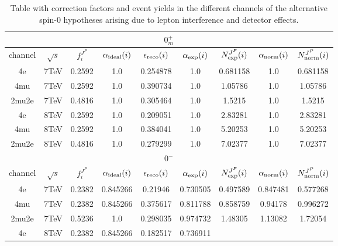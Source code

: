 \begin{table}[b]
\centering
\caption{
Table with correction factors and event yields in the different
channels of the alternative spin-0 hypotheses arising
due to lepton interference and detector effects.}
\centering %
\begin{tabular}{c c c c c c c c c} %
\hline \hline
 \multicolumn{9}{|c|}{$0^{+}_{m}$} \\ \hline 
channel & $\sqrt{s}$ & $f_{i}^{J^P}$ & $\alpha_{\rm ideal} (i)$ & $\epsilon_{\rm reco} (i)$ & $\alpha_{\rm exp} (i)$ & $N^{J^P}_{\rm exp} (i)$ & $\alpha_{\rm norm} (i)$ & $N^{J^P}_{\rm norm} (i)$\\ \hline 
4e & 7TeV & 0.2592 &  1.0  & 0.254878 &  1.0  & 0.681158 &  1.0  & 0.681158 \\ \hline 4mu & 7TeV & 0.2592 &  1.0  & 0.390734 &  1.0  & 1.05786 &  1.0  & 1.05786 \\ \hline 2mu2e & 7TeV & 0.4816 &  1.0  & 0.305464 &  1.0  & 1.5215 &  1.0  & 1.5215 \\ \hline \hline 4e & 8TeV & 0.2592 &  1.0  & 0.209051 &  1.0  & 2.83281 &  1.0  & 2.83281 \\ \hline 4mu & 8TeV & 0.2592 &  1.0  & 0.384041 &  1.0  & 5.20253 &  1.0  & 5.20253 \\ \hline 2mu2e & 8TeV & 0.4816 &  1.0  & 0.279299 &  1.0  & 7.02377 &  1.0  & 7.02377 \\ \hline \hline  \multicolumn{9}{|c|}{$0^{-}$} \\ \hline 
channel & $\sqrt{s}$ & $f_{i}^{J^P}$ & $\alpha_{\rm ideal} (i)$ & $\epsilon_{\rm reco} (i)$ & $\alpha_{\rm exp} (i)$ & $N^{J^P}_{\rm exp} (i)$ & $\alpha_{\rm norm} (i)$ & $N^{J^P}_{\rm norm} (i)$\\ \hline 
4e & 7TeV & 0.2382 & 0.845266 & 0.21946 & 0.730505
 & 0.497589%
 & 0.847481 & 0.577268 \\ \hline 4mu & 7TeV & 0.2382 & 0.845266 & 0.375617 & 0.811788
 & 0.858759%
 & 0.94178 & 0.996272 \\ \hline 2mu2e & 7TeV & 0.5236 & 1.0  & 0.298035 & 0.974732
 & 1.48305%
 & 1.13082 & 1.72054 \\ \hline \hline 
4e & 8TeV & 0.2382 & 0.845266 & 0.182517 & 0.736911

\end{tabular}
\end{table}
